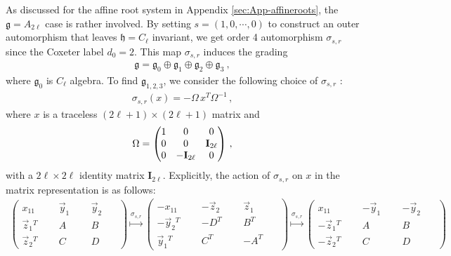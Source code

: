 As discussed for the affine root system in Appendix \ref{sec:App-affineroots}, the $\mathfrak{g} = A_{2\ell}$ case is rather involved. By setting $ s = (1, 0, \cdots, 0) $ to construct an outer automorphism that leaves $ \mathfrak{h} = C_\ell $ invariant, we get order 4 automorphism $ \sigma_{s,r} $ since the Coxeter label $ d_0 = 2 $. This map $ \sigma_{s,r} $ induces the grading
\begin{align}\label{eq:su(2l+1)_grading}
\mathfrak{g} = \mathfrak{g}_0 \oplus \mathfrak{g}_1 \oplus \mathfrak{g}_2 \oplus \mathfrak{g}_3\ ,
\end{align}
where $ \mathfrak{g}_0 $ is $ C_\ell $ algebra. To find $ \mathfrak{g}_{1,2,3} $, we consider the following choice of $ \sigma_{s,r} $ \cite{Tachikawa:2011ch}:
\begin{align}\label{eq:A_2l_sigma}
\sigma_{s,r}(x) = -\Omega\, x^T \Omega^{-1} \, ,
\end{align}
where $ x $ is a traceless $ (2\ell+1) \times (2\ell+1) $ matrix and
\begin{align}
\Omega = \mqty(1 & 0 & 0 \\ 0 & 0 & \mathbf{I}_{2\ell} \\ 0 & -\mathbf{I}_{2\ell} & 0)\ ,
\end{align}
with a $ 2\ell \times 2\ell $ identity matrix $ \mathbf{I}_{2\ell} $. Explicitly, the action of $\sigma_{s,r}$ on  $x$ in the matrix representation is as follows: 
\begin{align}\label{eq:ABCD}
\left(
\begin{array}{c|ccccc}
x_{11} & \phantom{x} & \vec{y}_1 & \phantom{x} & \vec{y}_2 & \phantom{x} \\ \hline
\vec{z}_1{}^T & & A & & B & \\
\vec{z}_2{}^T & & C & & D & 
\end{array}\right)
\overset{\sigma_{s,r}}{\longmapsto}
\left(
\begin{array}{c|ccccc}
-x_{11} & \phantom{x} & -\vec{z}_2 & \phantom{x} & \vec{z}_1 & \phantom{x} \\ \hline
-\vec{y}_2{}^T & & -D^T & & B^T & \\
\vec{y}_1{}^T & & C^T & & -A^T &
\end{array}\right)
\overset{\sigma_{s,r}}{\longmapsto}
\left(
\begin{array}{c|ccccc}
x_{11} & \phantom{x} & -\vec{y}_1 & \phantom{x} & -\vec{y}_2 & \phantom{x} \\ \hline
-\vec{z}_1{}^T & & A & & B & \\
-\vec{z}_2{}^T & & C & & D & 
\end{array}\right)
\end{align}
